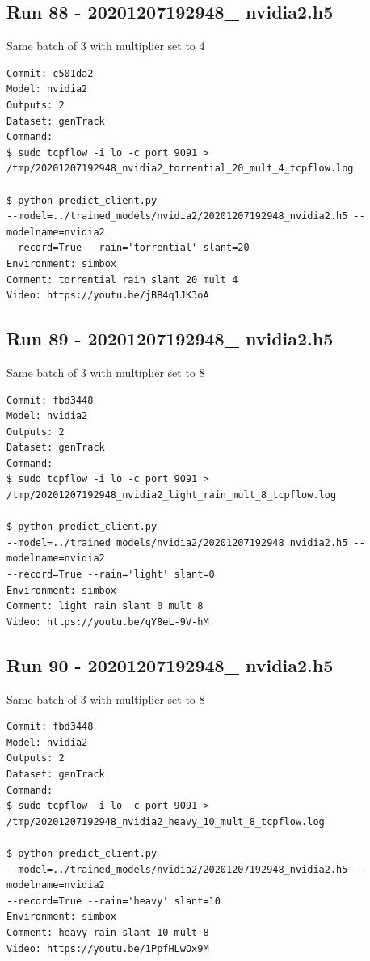 \subsection{Run 88 - 20201207192948\_ nvidia2.h5 }
Same batch of 3 with multiplier set to 4
\label{app_res:88}
\begin{verbatim}
Commit: c501da2
Model: nvidia2 
Outputs: 2
Dataset: genTrack
Command:
$ sudo tcpflow -i lo -c port 9091 > 
/tmp/20201207192948_nvidia2_torrential_20_mult_4_tcpflow.log

$ python predict_client.py
--model=../trained_models/nvidia2/20201207192948_nvidia2.h5 --modelname=nvidia2 
--record=True --rain='torrential' slant=20
Environment: simbox
Comment: torrential rain slant 20 mult 4
Video: https://youtu.be/jBB4q1JK3oA
\end{verbatim}

\subsection{Run 89 - 20201207192948\_ nvidia2.h5 }
Same batch of 3 with multiplier set to 8
\label{app_res:88}
\begin{verbatim}
Commit: fbd3448
Model: nvidia2 
Outputs: 2
Dataset: genTrack
Command:
$ sudo tcpflow -i lo -c port 9091 > 
/tmp/20201207192948_nvidia2_light_rain_mult_8_tcpflow.log

$ python predict_client.py
--model=../trained_models/nvidia2/20201207192948_nvidia2.h5 --modelname=nvidia2 
--record=True --rain='light' slant=0
Environment: simbox
Comment: light rain slant 0 mult 8
Video: https://youtu.be/qY8eL-9V-hM
\end{verbatim}

\subsection{Run 90 - 20201207192948\_ nvidia2.h5 }
Same batch of 3 with multiplier set to 8
\label{app_res:90}
\begin{verbatim}
Commit: fbd3448
Model: nvidia2 
Outputs: 2
Dataset: genTrack
Command:
$ sudo tcpflow -i lo -c port 9091 > 
/tmp/20201207192948_nvidia2_heavy_10_mult_8_tcpflow.log

$ python predict_client.py
--model=../trained_models/nvidia2/20201207192948_nvidia2.h5 --modelname=nvidia2 
--record=True --rain='heavy' slant=10
Environment: simbox
Comment: heavy rain slant 10 mult 8
Video: https://youtu.be/1PpfHLwOx9M
\end{verbatim}

